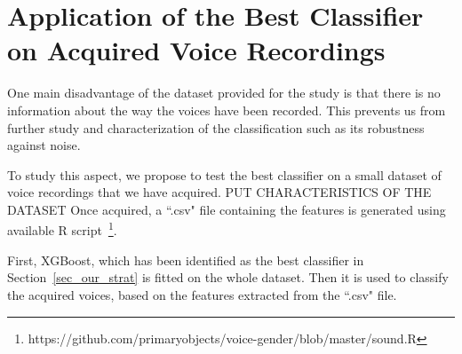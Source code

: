 \chapter{Application of the Best Classifier on Acquired Voice Recordings}
\label{chap_test_our_dataset}

One main disadvantage of the dataset provided for the study is that there is no information about the way the voices have been recorded. This prevents us from further study and characterization of the classification such as its robustness against noise.

To study this aspect, we propose to test the best classifier on a small dataset of voice recordings that we have acquired. PUT CHARACTERISTICS OF THE DATASET
Once acquired, a ``.csv" file containing the features is generated using available R script~\footnote{https://github.com/primaryobjects/voice-gender/blob/master/sound.R}. 

First, XGBoost, which has been identified as the best classifier in Section~\ref{sec_our_strat} is fitted on the whole dataset. Then it is used to classify the acquired voices, based on the features extracted from the ``.csv" file.

